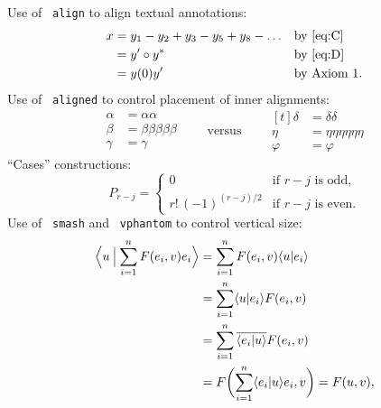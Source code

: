\documentclass[a4paper]{article}
\newcommand{\cn}[1]{\texttt{\char92 #1}}
\begin{document}
Use of \cn{align} to align textual annotations:
\begin{align}
x& = y_1-y_2+y_3-y_5+y_8-\dots
                    && \text{by \eqref{eq:C}}\\
 & = y'\circ y^*    && \text{by \eqref{eq:D}}\\
 & = y(0) y'        && \text {by Axiom 1.}
\end{align}
Use of \cn{aligned} to control placement of inner alignments:
\begin{equation*}
\begin{aligned}
\alpha&=\alpha\alpha\\
\beta&=\beta\beta\beta\beta\beta\\
\gamma&=\gamma
\end{aligned}
\qquad\text{versus}\qquad
\begin{aligned}[t]
\delta&=\delta\delta\\
\eta&=\eta\eta\eta\eta\eta\eta\\
\varphi&=\varphi
\end{aligned}
\end{equation*}
``Cases'' constructions:
\begin{equation}\label{eq:C}
P_{r-j}=
  \begin{cases}
    0&  \text{if $r-j$ is odd},\\
    r!\,(-1)^{(r-j)/2}&  \text{if $r-j$ is even}.
  \end{cases}
\end{equation}
Use of \cn{smash} and \cn{vphantom} to control vertical size:
\newcommand\ip[2]{\langle #1 \/ | #2 \/\rangle}
\newcommand\Ip[2]{\left\langle{\arraycolsep=0pt %
         \begin{array}{c|c}#1\/\,&\,#2\/\end{array}}%
         \right\rangle}
\newcommand\Ipd[2]{\left\langle{\arraycolsep=0pt %
         \begin{array}{c|c}\displaystyle#1\/\,&\,\displaystyle#2\/\end{array}}%
         \right\rangle}
\newcommand\conj[1]{\overline{#1}}
\begin{align*}
\Ipd{ u\: }{\: \smash{\sum_{i=1}^n F(e_i,v) e_i }\vphantom{\sum}}
&= \sum_{i=1}^n F(e_i,v) \ip{ u }{ e_i } \\
&= \sum_{i=1}^n \ip{ u }{ e_i } F(e_i,v) \\
&= \sum_{i=1}^n \conj{\ip{ e_i }{ u }} F(e_i,v) \\
&= F \biggl( \sum_{i=1}^n \ip{ e_i }{ u } e_i,v\biggr) = F( u, v
),
\end{align*}
\end{document}
